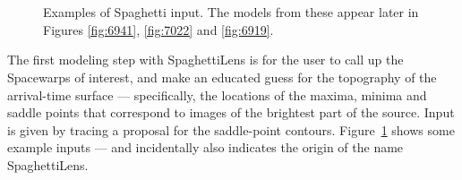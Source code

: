 \documentclass[12pt,preprint]{aastex}
\newcommand{\spl}{SpaghettiLens\xspace}
\newcommand{\sw}{Spacewarps\xspace}
\newcommand{\Figref}[1]{Figure~\ref{fig:#1}}
\begin{document}
\begin{figure}
  \centering
   \\
   \\
  \caption{Examples of Spaghetti input.  The models from these appear
    later in Figures \ref{fig:6941}, \ref{fig:7022} and \ref{fig:6919}.
  }
  \label{fig:input-spag}
\end{figure}

The first modeling step with \spl is for the user to call up the \sw
of interest, and make an educated guess for the topography of the
arrival-time surface --- specifically, the locations of the maxima,
minima and saddle points that correspond to images of the brightest
part of the source.  Input is given by tracing a proposal for the
saddle-point contours.  \Figref{input-spag} shows some example
inputs --- and incidentally also indicates the origin of the name
\spl.
\end{document}
